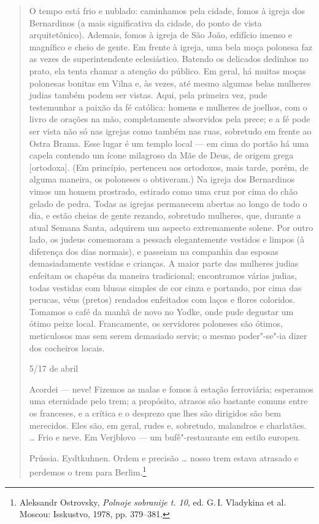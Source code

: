\begin{quote}
O tempo está frio e nublado: caminhamos pela cidade, fomos à igreja dos
Bernardinos (a mais significativa da cidade, do ponto de vista
arquitetônico). Ademais, fomos à igreja de São João, edifício imenso e
magnífico e cheio de gente. Em frente à igreja, uma bela moça polonesa
faz as vezes de superintendente eclesiástico. Batendo os delicados
dedinhos no prato, ela tenta chamar a atenção do público. Em geral, há
muitas moças polonesas bonitas em Vilna e, às vezes, até mesmo algumas
belas mulheres judias também podem ser vistas. Aqui, pela primeira vez,
pude testemunhar a paixão da fé católica: homens e mulheres de joelhos,
com o livro de orações na mão, completamente absorvidos pela prece; e a
fé pode ser vista não só nas igrejas como também nas ruas, sobretudo em
frente ao Ostra Brama. Esse lugar é um templo local --- em cima do portão
há uma capela contendo um ícone milagroso da Mãe de Deus, de origem
grega {[}ortodoxa{]}. (Em princípio, pertenceu aos ortodoxos, mais
tarde, porém, de alguma maneira, os poloneses o obtiveram.) Na igreja
dos Bernardinos vimos um homem prostrado, estirado como uma cruz por
cima do chão gelado de pedra. Todas as igrejas permanecem abertas ao
longo de todo o dia, e estão cheias de gente rezando, sobretudo
mulheres, que, durante a atual Semana Santa, adquirem um aspecto
extremamente solene. Por outro lado, os judeus comemoram a pessach
elegantemente vestidos e limpos (à diferença dos dias normais), e
passeiam na companhia das esposas demasiadamente vestidas e crianças. A
maior parte das mulheres judias enfeitam os chapéus da maneira
tradicional; encontramos várias judias, todas vestidas com blusas
simples de cor cinza e portando, por cima das perucas, véus (pretos)
rendados enfeitados com laços e flores coloridos. Tomamos o café da
manhã de novo no Yodke, onde pude degustar um ótimo peixe local.
Francamente, os servidores poloneses são ótimos, meticulosos mas sem
serem demasiado servis; o mesmo poder"-se"-ia dizer dos cocheiros locais.

5/17 de abril

Acordei --- neve! Fizemos as malas e fomos à estação ferroviária;
esperamos uma eternidade pelo trem; a propósito, atrasos são bastante
comuns entre os franceses, e a crítica e o desprezo que lhes são
dirigidos são bem merecidos. Eles são, em geral, rudes e, sobretudo,
malandros e charlatães. \ldots{} Frio e neve. Em Verjblovo --- um
bufê"-restaurante em estilo europeu.

Prússia. Eydtkuhnen. Ordem e precisão \ldots{} nosso trem estava
atrasado e perdemos o trem para Berlim.\footnote{Aleksandr Ostrovsky,
  \emph{Polnoje sobranije t. 10}, ed. G.\,I. Vladykina et al. Moscou:
  Isskustvo, 1978, pp. 379--381.}
\end{quote}

